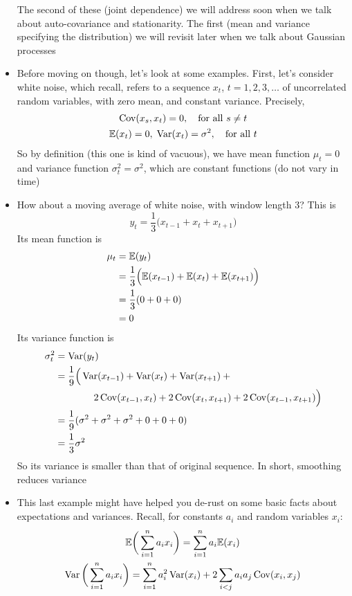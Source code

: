 \documentclass{article}
\begin{document}
\begin{itemize}
  The second of these (joint dependence) we will address soon when we talk about
  auto-covariance and stationarity. The first (mean and variance specifying the 
  distribution) we will revisit later when we talk about Gaussian processes  

\item Before moving on though, let's look at some examples. First, let's
  consider white noise, which recall, refers to a sequence $x_t$, $t =
  1,2,3,\dots$ of uncorrelated random variables, with zero mean, and constant
  variance. Precisely,   
  \begin{gather*}
  \operatorname{Cov}(x_s, x_t) = 0, \quad \text{for all $s \not= t$} \\
  \mathbb{E}(x_t) = 0, \; \operatorname{Var}(x_t) = \sigma^2, \quad \text{for all $t$} 
  \end{gather*}
  So by definition (this one is kind of vacuous), we have mean function $\mu_t =
  0$ and variance function $\sigma^2_t = \sigma^2$, which are constant functions
  (do not vary in time)

\item How about a moving average of white noise, with window length 3? This is 
  \[
  y_t = \frac{1}{3} \Big( x_{t-1} + x_t + x_{t+1} \Big)
  \]
  Its mean function is
  \begin{align*}
  \mu_t &= \mathbb{E}(y_t)  \\
  &= \frac{1}{3} \Big( \mathbb{E}(x_{t-1}) + \mathbb{E}(x_t) + \mathbb{E}(x_{t+1}) \Big) \\ 
  &= \frac{1}{3} ( 0 + 0 + 0 ) \\
  &= 0
  \end{align*}
  Its variance function is
  \begin{align*}
  \sigma^2_t &= \operatorname{Var}(y_t) \\
  &= \frac{1}{9} \Big( \operatorname{Var}(x_{t-1}) + \operatorname{Var}(x_t) + \operatorname{Var}(x_{t+1}) +{} \\
  &\qquad\qquad 2 \operatorname{Cov}(x_{t-1}, x_t) + 2 \operatorname{Cov}(x_t, x_{t+1}) + 2 \operatorname{Cov}(x_{t-1}, 
    x_{t+1}) \Big) \\
  &= \frac{1}{9} ( \sigma^2 + \sigma^2 + \sigma^2 + 0 + 0 + 0) \\
  &= \frac{1}{3} \sigma^2
  \end{align*}
  So its variance is smaller than that of original sequence. In short, smoothing
  reduces variance 

\item This last example might have helped you de-rust on some basic facts about
  expectations and variances. Recall, for constants $a_i$ and random variables
  $x_i$: 
  \begin{gather*}
  \mathbb{E}\bigg( \sum_{i=1}^n a_i x_i \bigg) = \sum_{i=1}^n a_i \mathbb{E}(x_i) \\
  \operatorname{Var}\bigg( \sum_{i=1}^n a_i x_i \bigg) = \sum_{i=1}^n a_i^2 \operatorname{Var}(x_i) + 2
  \sum_{i < j} a_i a_j \operatorname{Cov}(x_i, x_j) 
  \end{gather*}


\end{itemize}
\end{document}
